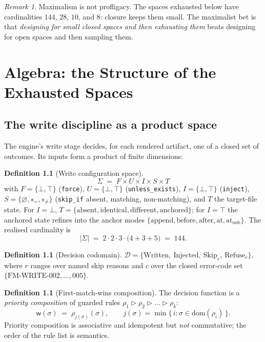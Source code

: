 \documentclass[11pt,a4paper]{report}
\theoremstyle{definition}
\newtheorem{definition}[theorem]{Definition}
\theoremstyle{remark}
\newtheorem{remark}[theorem]{Remark}
\newcommand{\wdec}{\mathsf{w}}
\newcommand{\Sig}{\Sigma}
\newcommand{\Out}{\mathcal{D}}
\begin{document}
\begin{remark}
Maximalism is not profligacy. The spaces exhausted below have cardinalities
$144$, $28$, $10$, and $8$: closure keeps them small. The maximalist bet is
that \emph{designing for small closed spaces and then exhausting them} beats
designing for open spaces and then sampling them.
\end{remark}

\chapter{Algebra: the Structure of the Exhausted Spaces}

\section{The write discipline as a product space}

The engine's write stage decides, for each rendered artifact, one of a closed
set of outcomes. Its inputs form a product of finite dimensions:

\begin{definition}[Write configuration space]\label{def:sigma}
\[
  \Sig \;=\; F \times U \times I \times S \times T
\]
with
$F = \{\bot,\top\}$ (\texttt{force}),
$U = \{\bot,\top\}$ (\texttt{unless\_exists}),
$I = \{\bot,\top\}$ (\texttt{inject}),
$S = \{\varnothing, s_{=}, s_{\neq}\}$ (\texttt{skip\_if} absent, matching,
non-matching), and $T$ the target-file state. For $I=\bot$,
$T = \{\mathrm{absent}, \mathrm{identical}, \mathrm{different},
\mathrm{anchored}\}$; for $I=\top$ the anchored state refines into the anchor
modes $\{\mathrm{append}, \mathrm{before}, \mathrm{after},
\mathrm{at}, \mathrm{at}_{\mathrm{oob}}\}$. The realised cardinality is
\[
  |\Sig| \;=\; 2\cdot 2\cdot 3\cdot\bigl(4 + 3 + 5\bigr) \;=\; 144 .
\]
\end{definition}

\begin{definition}[Decision codomain]
$\Out = \{\mathrm{Written},\ \mathrm{Injected},\
\mathrm{Skip}_r,\ \mathrm{Refuse}_c\}$, where $r$ ranges over named skip
reasons and $c$ over the closed error-code set
$\{\text{FM-WRITE-}002,\dots,005\}$.
\end{definition}

\begin{definition}[First-match-wins composition]\label{def:fmw}
The decision function is a \emph{priority composition} of guarded rules
$\rho_1 \triangleright \rho_2 \triangleright \dots \triangleright \rho_k$:
\[
  \wdec(\sigma) \;=\; \rho_{j(\sigma)}(\sigma), \qquad
  j(\sigma) = \min\{\, i : \sigma \in \mathrm{dom}(\rho_i) \,\}.
\]
Priority composition is associative and idempotent but \emph{not}
commutative; the order of the rule list is semantics.
\end{definition}
\end{document}
